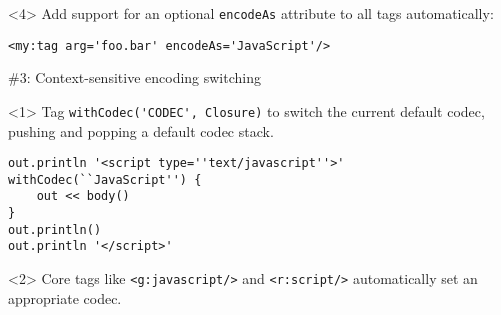 \begin{frame}
    \begin{onlyenv}<4>
      Add support for an optional \verb|encodeAs| attribute to all tags automatically:
      \begin{center}
        \begin{minipage}{\textwidth}
          \begin{verbatim}
<my:tag arg='foo.bar' encodeAs='JavaScript'/>
          \end{verbatim}
        \end{minipage}
      \end{center}
    \end{onlyenv}

\end{frame}



\begin{frame}

    \begin{center}
      \Huge \#3: Context-sensitive encoding switching
    \end{center}

    \vspace{1cm}

    \begin{onlyenv}<1>
      Tag \verb|withCodec('CODEC', Closure)| to switch the current default codec, pushing and popping a default codec stack.
      \begin{center}
        \begin{minipage}{\textwidth}
          \begin{verbatim}
out.println '<script type=''text/javascript''>'
withCodec(``JavaScript'') {
    out << body()
}
out.println()
out.println '</script>'
          \end{verbatim}
        \end{minipage}
      \end{center}
    \end{onlyenv}

    \begin{onlyenv}<2>
      Core tags like \verb|<g:javascript/>| and \verb|<r:script/>| automatically set an appropriate codec.
    \end{onlyenv}

\end{frame}



